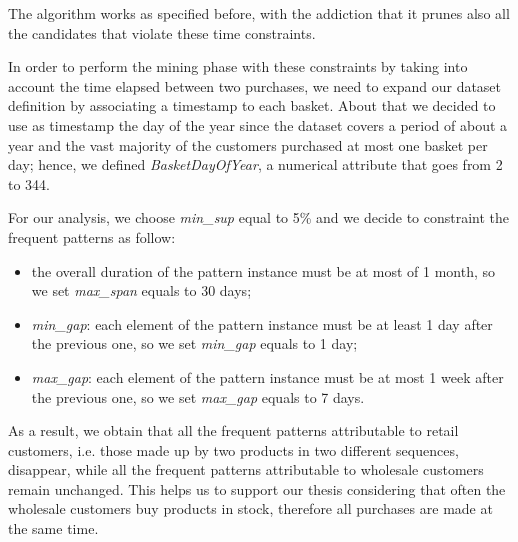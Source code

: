 The algorithm works as specified before, with the addiction that it prunes also all the candidates that violate these time constraints.

In order to perform the mining phase with these constraints by taking into account the time elapsed between two purchases, we need to expand our dataset definition by associating a timestamp to each basket. About that we decided to use as timestamp the day of the year since the dataset covers a period of about a year and the vast majority of the customers purchased at most one basket per day; hence, we defined \emph{BasketDayOfYear}, a numerical attribute that goes from 2 to 344.

For our analysis, we choose \emph{min\_sup} equal to 5\% and we decide to constraint the frequent patterns as follow: 

\begin{itemize}
\item the overall duration of the pattern instance must be at most of 1 month, so we set \emph{max\_span} equals to 30 days;
\item \emph{min\_gap}: each element of the pattern instance must be at least 1 day after the previous one, so we set \emph{min\_gap} equals to 1 day;
\item \emph{max\_gap}: each element of the pattern instance must be at most 1 week after the previous one, so we set \emph{max\_gap} equals to 7 days.
\end{itemize}

As a result, we obtain that all the frequent patterns attributable to retail customers, i.e. those made up by two products in two different sequences, disappear, while all the frequent patterns attributable to wholesale customers remain unchanged. This helps us to support our thesis considering that often the wholesale customers buy products in stock, therefore all purchases are made at the same time.
